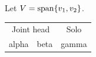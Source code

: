 \documentclass{article}
\def\span{{\rm span}}
\begin{document}
Let $V=\span\{v_1,v_2\}$.
\begin{tabular}{|c|c|c|}
\multicolumn{2}{|c|}{Joint head} & Solo \\
alpha & beta & gamma \\
\end{tabular}
\end{document}
